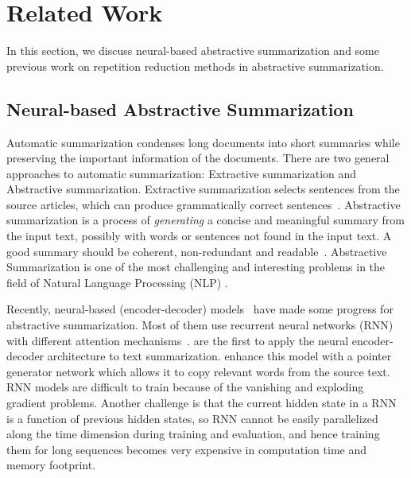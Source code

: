 \section{Related Work}
\label{sec:related}
In this section, we 
discuss neural-based abstractive summarization
and some previous work on repetition reduction methods in
abstractive summarization.

\subsection{Neural-based Abstractive Summarization}
Automatic summarization
condenses long documents into short summaries
while preserving the important information of the documents.
\citep{RadevHM02,AllahyariPASTGK17,Tian18}
There are two general approaches to automatic summarization: 
Extractive summarization and Abstractive summarization.
Extractive summarization selects sentences 
from the source articles, which can produce
grammatically correct sentences~\citep{BokaeiSL16,VermaL17,NaserasadiKS19,ZhongLWQH19}.
Abstractive summarization is a process of {\em generating} a concise and 
meaningful summary from the input text, possibly with words or sentences 
not found in the input text. 
A good summary should be coherent, 
non-redundant and readable~\citep{YaoWX17}.
Abstractive Summarization is one of the most challenging and 
interesting problems in the field of Natural Language Processing (NLP)
\citep{CareniniC08,PallottaDB09,SankarasubramaniamRG14,BingLLLGP15,RushCW15,LiHZ16,YaoWX17,MohamedO19,LierdeC19,NguyenCNN19}.

Recently, neural-based (encoder-decoder) models~\citep{RushCW15,ChopraAR16,NallapatiZSGX16,SeeLM17,PaulusXS17,LiuL19,ZhangWZ19,WangQW19}
have made some progress for abstractive summarization.
Most of them use recurrent neural networks (RNN) with different attention 
mechanisms~\citep{RushCW15,NallapatiZSGX16,SeeLM17,PaulusXS17,ZhangWZ19}. \citet{RushCW15} are the first to apply the 
neural encoder-decoder architecture to text summarization. 
\citet{SeeLM17} enhance this model with a pointer generator network 
which allows it to copy relevant words from the source text.
RNN models are difficult to train because of the 
vanishing and exploding gradient problems.
Another challenge is that the current hidden state in a RNN is 
a function of previous hidden states, so RNN cannot be easily
parallelized along the time dimension during training and evaluation, 
and hence training them for long sequences becomes very expensive in 
computation time and memory footprint.


